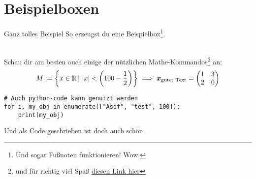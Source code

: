 \section{Beispielboxen}
\begin{Beispiel}{Ganz tolles Beispiel}
So erzeugst du eine Beispielbox\footnote{Und sogar Fußnoten funktionieren! Wow.}.\\
\\
\end{Beispiel}


Schau dir am besten auch einige der nützlichen Mathe-Kommandos\footnote{und für richtig viel Spaß \href{\RickRollLink}{diesen Link hier}} an:
\begin{equation}
    M:=\left\{x\in\mathbb{R}\,|\,\left|{x}\right|<\left({100-\frac{1}{2}}\right)\right\}\implies {{\text{\boldmath${x}$}}}_{\text{guter Text}} = \begin{pmatrix}1&3\\2&0\end{pmatrix}
\end{equation}

\begin{lstlisting}
# Auch python-code kann genutzt werden
for i, my_obj in enumerate(["Asdf", "test", 100]):
    print(my_obj)
\end{lstlisting}
Und  als Code geschrieben ist doch auch schön.